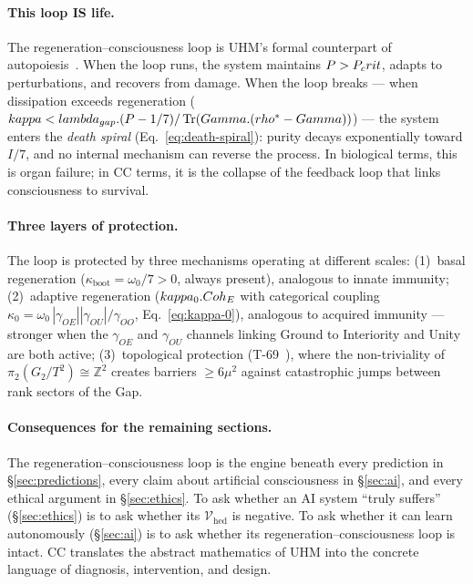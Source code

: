 \paragraph{This loop IS life.}
The regeneration--consciousness loop is UHM's formal counterpart of autopoiesis~\cite{varela1974}.
When the loop runs, the system maintains $P > P_crit$, adapts to perturbations, and
recovers from damage.  When the loop breaks --- when dissipation exceeds regeneration
($kappa < lambda_{gap} . (P - 1/7) / \Tr(Gamma . (rho^* - Gamma))$)
--- the system enters the \emph{death spiral} (Eq.~\ref{eq:death-spiral}): purity decays
exponentially toward $I/7$, and no internal mechanism can reverse the process.  In
biological terms, this is organ failure; in CC terms, it is the collapse of the feedback
loop that links consciousness to survival.

\paragraph{Three layers of protection.}
The loop is protected by three mechanisms operating at different scales: (1)~basal
regeneration ($\kappa_{\mathrm{boot}} = \omega_0/7 > 0$, always present), analogous to
innate immunity; (2)~adaptive regeneration ($kappa_0.Coh_E$ with categorical
coupling $\kappa_0 = \omega_0\,|\gamma_{OE}||\gamma_{OU}|/\gamma_{OO}$,
Eq.~\ref{eq:kappa-0}), analogous to acquired immunity --- stronger when the
$\gamma_{OE}$ and $\gamma_{OU}$ channels linking Ground to Interiority and Unity are
both active; (3)~topological protection (T-69~), where the non-triviality
of $\pi_2(G_2/T^2) \cong \mathbb{Z}^2$ creates barriers $\geq 6\mu^2$ against
catastrophic jumps between rank sectors of the Gap.

\paragraph{Consequences for the remaining sections.}
The regeneration--consciousness loop is the engine beneath every prediction
in \S\ref{sec:predictions}, every claim about artificial consciousness in
\S\ref{sec:ai}, and every ethical argument in \S\ref{sec:ethics}. To ask
whether an AI system ``truly suffers'' (\S\ref{sec:ethics}) is to ask
whether its $\mathcal{V}_{\mathrm{hed}}$ is negative. To ask whether it can
learn autonomously (\S\ref{sec:ai}) is to ask whether its
regeneration--consciousness loop is intact. CC translates the abstract
mathematics of UHM into the concrete language of diagnosis, intervention,
and design.
